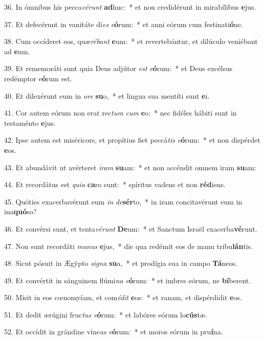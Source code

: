 36. In ómnibus his pecca\textit{vé}\textit{runt} \textbf{ad}huc:~*  et non credidérunt in mirabílibus \textbf{e}jus.\

37. Et defecérunt in vanitáte di\textit{es} \textit{e}\textbf{ó}rum:~*  et anni eórum cum festinati\textbf{ó}ne.\

38. Cum occíderet eos, quæ\textit{ré}\textit{bant} \textbf{e}um:~*  et revertebántur, et dilúculo veniébant ad \textbf{e}um.\

39. Et rememoráti sunt quia Deus adjútor \textit{est} \textit{e}\textbf{ó}rum:~*  et Deus excélsus redémptor e\textbf{ó}rum est.\

40. Et dilexérunt eum in \textit{o}\textit{re} \textbf{su}o,~*  et lingua sua mentíti sunt \textbf{e}i.\

41. Cor autem eórum non erat rec\textit{tum} \textit{cum} \textbf{e}o:~*  nec fidéles hábiti sunt in testaménto \textbf{e}jus.\

42. Ipse autem est miséricors, et propítius fiet peccá\textit{tis} \textit{e}\textbf{ó}rum:~*  et non dispérdet \textbf{e}os.\

43. Et abundávit ut avérteret \textit{i}\textit{ram} \textbf{su}am:~*  et non accéndit omnem iram \textbf{su}am:\

44. Et recordátus est \textit{qui}\textit{a} \textbf{ca}ro sunt:~*  spíritus vadens et non \textbf{réd}iens.\

45. Quóties exacerbavérunt eum \textit{in} \textit{de}\textbf{sér}to,~*  in iram concitavérunt eum in ina\textbf{quó}so?\

46. Et convérsi sunt, et tenta\textit{vé}\textit{runt} \textbf{De}um:~*  et Sanctum Israël exacerba\textbf{vé}runt.\

47. Non sunt recordáti \textit{ma}\textit{nus} \textbf{e}jus,~*  die qua redémit eos de manu tribu\textbf{lán}tis.\

48. Sicut pósuit in Ægýpto \textit{si}\textit{gna} \textbf{su}a,~*  et prodígia sua in campo \textbf{Tá}neos.\

49. Et convértit in sánguinem flúmi\textit{na} \textit{e}\textbf{ó}rum:~*  et imbres eórum, ne \textbf{bí}berent.\

50. Misit in eos cœnomyíam, et com\textit{é}\textit{dit} \textbf{e}os:~*  et ranam, et dispérdidit \textbf{e}os.\

51. Et dedit ærúgini fruc\textit{tus} \textit{e}\textbf{ó}rum:~*  et labóres eórum lo\textbf{cús}tæ.\

52. Et occídit in grándine víne\textit{as} \textit{e}\textbf{ó}rum:~*  et moros eórum in pru\textbf{í}na.\

